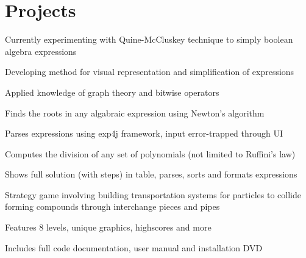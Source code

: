 \documentclass[]{deedy-resume-openfont}
\begin{document}
\begin{minipage}[t]{0.66\textwidth}

\section{Projects}

\begin{tightemize}
\item Currently experimenting with Quine-McCluskey technique to simply boolean algebra expressions\\
\item Developing method for visual representation and simplification of expressions\\
\item Applied knowledge of graph theory and bitwise operators\\
\end{tightemize}
\sectionsep


\begin{tightemize}
\item Finds the roots in any algabraic expression using Newton's algorithm\\
\item Parses expressions using exp4j framework, input error-trapped through UI\\
\end{tightemize}
\sectionsep


\begin{tightemize}
\item Computes the division of any set of polynomials (not limited to Ruffini's law)\\
\item Shows full solution (with steps) in table, parses, sorts and formats expressions\\
\end{tightemize}
\sectionsep

\begin{tightemize}
\item Strategy game involving building transportation systems for particles to collide forming compounds through interchange pieces and pipes\\
\item Features 8 levels, unique graphics, highscores and more\\
\item Includes full code documentation, user manual and installation DVD\\
\end{tightemize}
\sectionsep


\end{minipage}
\end{document}
